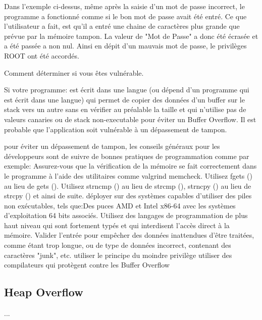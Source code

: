 Dans l'exemple ci-dessus, même après la saisie d'un mot de passe incorrect, le programme a fonctionné comme si le bon mot de passe avait été entré.
Ce que l'utilisateur a fait, est qu'il a entré une chaine de caractères plus grande que prévue par la mémoire tampon. La valeur de "Mot de Passe" a donc été écrasée et a été passée a non nul. Ainsi en dépit d'un mauvais mot de passe, le privilèges ROOT ont été accordés.\newline 

Comment déterminer si vous êtes vulnérable.\newline 

Si votre programme:\newline 
est écrit dans une langue (ou dépend d'un programme qui est écrit dans une langue) qui permet de copier des données d'un buffer sur le stack vers un autre sans en vérifier au préalable la taille et qui n'utilise pas de valeurs canaries ou de stack non-executable pour éviter un Buffer Overflow. Il est probable que l'application soit vulnérable à un dépassement de tampon.\newline 

pour éviter un dépassement de tampon, les conseils généraux pour les développeurs sont de suivre de bonnes pratiques de programmation comme par exemple:\newline 
Assurez-vous que la vérification de la mémoire se fait correctement dans le programme à l'aide des utilitaires comme valgrind memcheck.
Utilisez fgets () au lieu de gets ().
Utilisez strncmp () au lieu de strcmp (), strncpy () au lieu de strcpy () et ainsi de suite. déployer sur des systèmes capables d'utiliser des piles non exécutables, tels que:Des puces AMD et Intel x86-64  avec les systèmes d'exploitation 64 bits associés.
Utilisez des langages de programmation de plus haut niveau qui sont fortement typés et qui interdisent l'accès direct à la mémoire.
Valider l'entrée pour empêcher  des données inattendues d'être traitées, comme étant trop longue, ou de type de données incorrect, contenant des caractères "junk", etc.
utiliser le principe du moindre privilège
utiliser des compilateurs qui protègent contre les Buffer Overflow 


\subsection{Heap Overflow}\label{vulnerabilites:applicatives:buffer-overflow:heap}

...

\endinput
